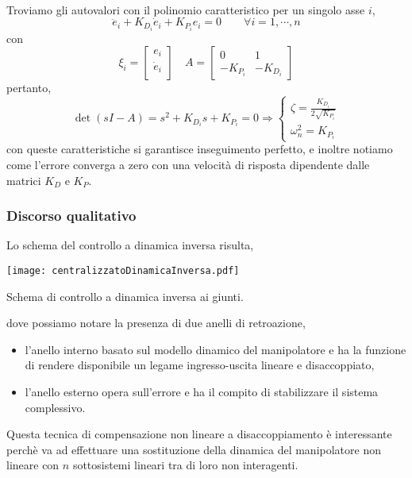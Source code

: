\paragraph{}
Troviamo gli autovalori con il polinomio caratteristico per un singolo asse $i$,
\begin{equation}
	\ddot{e}_i + K_{D_i} \dot{e}_i +K_{P_i} e_i = 0 \qquad \forall i = 1, \cdots, n
\end{equation}
con 
\begin{equation}
	\xi_i = 
	\begin{bmatrix}
		e_i \\
		\dot{e}_i \\
	\end{bmatrix}
	\quad
	A = 
	\begin{bmatrix}
		0 & 1 \\
		-K_{P_i} & -K_{D_i}
	\end{bmatrix}
\end{equation}
pertanto,
\begin{equation}
	\det(sI-A) = s^2 + K_{D_i}s + K_{P_i} = 0 \Rightarrow 
	\begin{cases}
		\zeta = \frac{K_{D_i}}{2 \sqrt{K_{P_i}}} \\
		\omega_n^2 = K_{P_i}
	\end{cases}
\end{equation}
con queste caratteristiche si garantisce inseguimento perfetto, e inoltre notiamo come l'errore converga a zero con una velocità di risposta dipendente dalle matrici $K_D$ e $K_P$. 

\subsubsection{Discorso qualitativo}
Lo schema del controllo a dinamica inversa risulta,
\begin{center}
	\texttt{[image: centralizzatoDinamicaInversa.pdf]}
	\caption{Schema di controllo a dinamica inversa ai giunti.}
\end{center}
dove possiamo notare la presenza di due anelli di retroazione,
\begin{itemize}
	\item l'anello interno basato sul modello dinamico del manipolatore e ha la funzione di rendere disponibile un legame ingresso-uscita lineare e disaccoppiato,
	\item l'anello esterno opera sull'errore e ha il compito di stabilizzare il sistema complessivo.
\end{itemize}
Questa tecnica di compensazione non lineare a disaccoppiamento è interessante perchè va ad effettuare una sostituzione della dinamica del manipolatore non lineare con $n$ sottosistemi lineari tra di loro non interagenti. 

